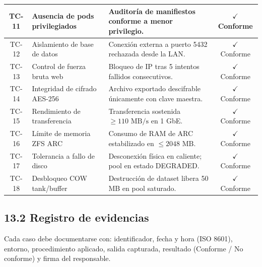 \documentclass[10pt,a4paper]{article}
\begin{document}
\begin{table}[htbp]
\begin{tabular}{|c|p{4.5cm}|p{6cm}|c|}
TC-11 & Ausencia de pods privilegiados & Auditoría de manifiestos conforme a menor privilegio. & $\checkmark$ Conforme \\
\hline
TC-12 & Aislamiento de base de datos & Conexión externa a puerto 5432 rechazada desde la LAN. & $\checkmark$ Conforme \\
\hline
TC-13 & Control de fuerza bruta web & Bloqueo de IP tras 5 intentos fallidos consecutivos. & $\checkmark$ Conforme \\
\hline
TC-14 & Integridad de cifrado AES-256 & Archivo exportado descifrable únicamente con clave maestra. & $\checkmark$ Conforme \\
\hline
TC-15 & Rendimiento de transferencia & Transferencia sostenida $\ge 110\text{ MB/s}$ en 1 GbE. & $\checkmark$ Conforme \\
\hline
TC-16 & Límite de memoria ZFS ARC & Consumo de RAM de ARC estabilizado en $\le 2048\text{ MB}$. & $\checkmark$ Conforme \\
\hline
TC-17 & Tolerancia a fallo de disco & Desconexión física en caliente; pool en estado DEGRADED. & $\checkmark$ Conforme \\
\hline
TC-18 & Desbloqueo COW tank/buffer & Destrucción de dataset libera 50 MB en pool saturado. & $\checkmark$ Conforme \\
\hline
\end{tabular}
\end{table}

\subsection{13.2 Registro de evidencias}
Cada caso debe documentarse con: identificador, fecha y hora (ISO 8601), entorno, procedimiento aplicado, salida capturada, resultado (Conforme / No conforme) y firma del responsable.
\end{document}
